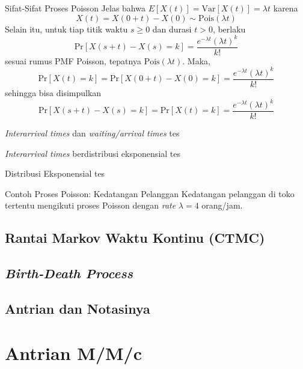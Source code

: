 \documentclass{beamer}
\newcommand{\pars}[1]{\left(#1\right)}
\newcommand{\brackets}[1]{\left[#1\right]}
\begin{document}
\begin{frame}{Sifat-Sifat Proses Poisson}
    Jelas bahwa \(E\brackets{X(t)} = \text{Var}\brackets{X(t)} = \lambda t\) karena
    \[X(t) = X(0+t) - X(0) \sim \text{Pois}(\lambda t)\]
    Selain itu, untuk tiap titik waktu \(s \ge 0\) dan durasi \(t > 0\), berlaku
    \[\text{Pr}\brackets{X(s+t) - X(s) = k} = \frac{e^{-\lambda t}\pars{\lambda t}^k}{k!}\]
    sesuai rumus PMF Poisson, tepatnya \(\text{Pois}(\lambda t)\). Maka,
    \[\text{Pr}\brackets{X(t) = k} = \text{Pr}\brackets{X(0+t) - X(0) = k} = \frac{e^{-\lambda t}\pars{\lambda t}^k}{k!}\]
    sehingga bisa disimpulkan
    \[\text{Pr}\brackets{X(s+t) - X(s) = k} = \text{Pr}\brackets{X(t) = k} = \frac{e^{-\lambda t}\pars{\lambda t}^k}{k!}\]
\end{frame}

\begin{frame}{\textit{Interarrival times} dan \textit{waiting/arrival times}}
    tes
\end{frame}

\begin{frame}{\textit{Interarrival times} berdistribusi eksponensial}
    tes
\end{frame}

\begin{frame}{Distribusi Eksponensial}
    tes
\end{frame}

\begin{frame}{Contoh Proses Poisson: Kedatangan Pelanggan}
    Kedatangan pelanggan di toko tertentu mengikuti proses Poisson dengan \textit{rate} \(\lambda = 4\) orang/jam. 
\end{frame}

\subsection{Rantai Markov Waktu Kontinu (CTMC)}

\subsection{\textit{Birth-Death Process}}

\subsection{Antrian dan Notasinya}

\section{Antrian M/M/c}
\end{document}
